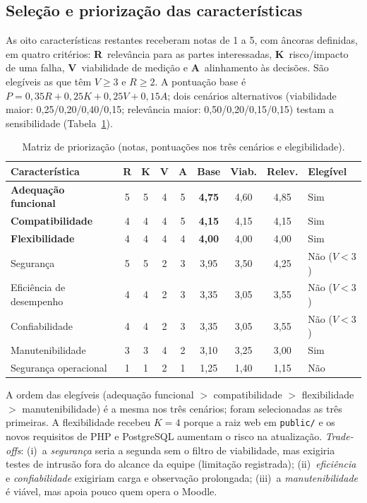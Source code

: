 \documentclass[12pt]{article}
\newcommand{\tabfonte}[1]{\par\vspace{2pt}{\footnotesize Fonte: #1}}
\begin{document}
\subsection{Seleção e priorização das características}

As oito características restantes receberam notas de 1 a 5, com âncoras definidas, em quatro critérios: \textbf{R}~relevância para as partes interessadas, \textbf{K}~risco/impacto de uma falha, \textbf{V}~viabilidade de medição e \textbf{A}~alinhamento às decisões. São elegíveis as que têm $V \geq 3$ e $R \geq 2$. A pontuação base é $P = 0{,}35R + 0{,}25K + 0{,}25V + 0{,}15A$; dois cenários alternativos (viabilidade maior: 0,25/0,20/0,40/0,15; relevância maior: 0,50/0,20/0,15/0,15) testam a sensibilidade (Tabela~\ref{tab:prior}).

\begin{table}[!ht]
\centering
\caption{Matriz de priorização (notas, pontuações nos três cenários e elegibilidade).}
\label{tab:prior}
\scriptsize
\begin{tabular}{lcccccccl}
\toprule
\textbf{Característica} & \textbf{R} & \textbf{K} & \textbf{V} & \textbf{A} & \textbf{Base} & \textbf{Viab.} & \textbf{Relev.} & \textbf{Elegível} \\
\midrule
\textbf{Adequação funcional} & 5 & 5 & 4 & 5 & \textbf{4,75} & 4,60 & 4,85 & Sim \\
\textbf{Compatibilidade} & 4 & 4 & 4 & 5 & \textbf{4,15} & 4,15 & 4,15 & Sim \\
\textbf{Flexibilidade} & 4 & 4 & 4 & 4 & \textbf{4,00} & 4,00 & 4,00 & Sim \\
Segurança & 5 & 5 & 2 & 3 & 3,95 & 3,50 & 4,25 & Não ($V<3$) \\
Eficiência de desempenho & 4 & 4 & 2 & 3 & 3,35 & 3,05 & 3,55 & Não ($V<3$) \\
Confiabilidade & 4 & 4 & 2 & 3 & 3,35 & 3,05 & 3,55 & Não ($V<3$) \\
Manutenibilidade & 3 & 3 & 4 & 2 & 3,10 & 3,25 & 3,00 & Sim \\
Segurança operacional & 1 & 1 & 2 & 1 & 1,25 & 1,40 & 1,15 & Não \\
\bottomrule
\end{tabular}
\tabfonte{elaboração própria. As pontuações foram conferidas por script.}
\end{table}

A ordem das elegíveis (adequação funcional $>$ compatibilidade $>$ flexibilidade $>$ manutenibilidade) é a mesma nos três cenários; foram selecionadas as três primeiras. A flexibilidade recebeu $K=4$ porque a raiz web em \texttt{public/} e os novos requisitos de PHP e PostgreSQL aumentam o risco na atualização. \emph{Trade-offs}: (i)~a \emph{segurança} seria a segunda sem o filtro de viabilidade, mas exigiria testes de intrusão fora do alcance da equipe (limitação registrada); (ii)~\emph{eficiência} e \emph{confiabilidade} exigiriam carga e observação prolongada; (iii)~a \emph{manutenibilidade} é viável, mas apoia pouco quem opera o Moodle.
\end{document}
